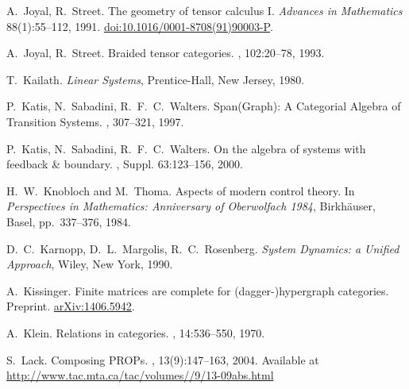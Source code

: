 \begin{thebibliography}{RSW00}
    A.\ Joyal, R.\ Street.
    \newblock The geometry of tensor calculus I.
    \newblock \emph{Advances in Mathematics} { 88}(1):55--112, 1991.
    \newblock \href{http://doi.org/10.1016/0001-8708(91)90003-P}{doi:10.1016/0001-8708(91)90003-P}.

    A.\ Joyal, R.\ Street.
    \newblock Braided tensor categories.
    , { 102}:20--78, 1993.

    T.\ Kailath.
    \newblock \emph{Linear Systems}, Prentice-Hall, New Jersey, 1980.

    P.\ Katis, N.\ Sabadini, R.\ F.\ C.\ Walters.
    \newblock Span(Graph): A Categorial Algebra of Transition Systems.
    , 307--321, 1997. 

    P.\ Katis, N.\ Sabadini, R.\ F.\ C.\ Walters.
    \newblock On the algebra of systems with feedback \& boundary.
    ,
    Suppl. { 63}:123--156, 2000.

    H.\ W.\ Knobloch and M.\ Thoma.
    \newblock Aspects of modern control theory. 
      \newblock In {\sl Perspectives in Mathematics: Anniversary of Oberwolfach
      1984}, Birkh\"auser, Basel, pp.\ 337--376, 1984. 


    D.\ C.\ Karnopp, D.\ L.\ Margolis, R.\ C.\ Rosenberg.
    \newblock \textsl{System Dynamics: a Unified Approach}, Wiley, New York, 1990.

    A.\ Kissinger.
    \newblock Finite matrices are complete for (dagger-)hypergraph categories.
    \newblock Preprint.
    \newblock \href{http://arxiv.org/abs/1406.5942}{arXiv:1406.5942}.

    A.\ Klein. 
    \newblock Relations in categories. 
    , 14:536--550, 1970.

    S.\ Lack.
    \newblock Composing PROPs.
    , { 13}(9):147--163,
    2004.
    \newblock Available at
    \href{http://www.tac.mta.ca/tac/volumes/13/9/13-09abs.html}{http://www.tac.mta.ca/tac/volumes//9/13-09abs.html}


\end{thebibliography}
